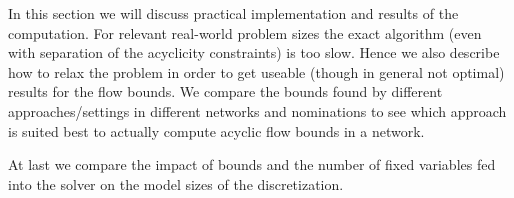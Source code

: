 In this section we will discuss practical implementation and results of the computation. For relevant real-world 
problem sizes the exact algorithm (even with separation of the acyclicity constraints) is too slow. Hence we also 
describe how to relax the problem in order to get useable (though in general not optimal) results for the flow bounds. 
We compare the bounds found by different approaches/settings in different networks and nominations to see which 
approach is suited best to actually compute acyclic flow bounds in a network. 

At last we compare the impact of bounds and the number of fixed variables fed into the solver on the model sizes of the 
discretization. \\

